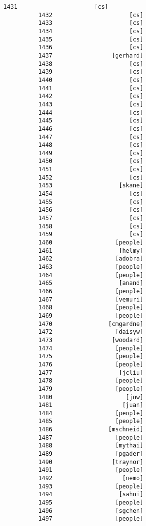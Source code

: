 \documentclass[11pt]{article}
\begin{document}
\begin{Verbatim}[commandchars=\\\{\}]
          1431                      [cs]
          1432                      [cs]
          1433                      [cs]
          1434                      [cs]
          1435                      [cs]
          1436                      [cs]
          1437                 [gerhard]
          1438                      [cs]
          1439                      [cs]
          1440                      [cs]
          1441                      [cs]
          1442                      [cs]
          1443                      [cs]
          1444                      [cs]
          1445                      [cs]
          1446                      [cs]
          1447                      [cs]
          1448                      [cs]
          1449                      [cs]
          1450                      [cs]
          1451                      [cs]
          1452                      [cs]
          1453                   [skane]
          1454                      [cs]
          1455                      [cs]
          1456                      [cs]
          1457                      [cs]
          1458                      [cs]
          1459                      [cs]
          1460                  [people]
          1461                   [helmy]
          1462                  [adobra]
          1463                  [people]
          1464                  [people]
          1465                   [anand]
          1466                  [people]
          1467                  [vemuri]
          1468                  [people]
          1469                  [people]
          1470                [cmgardne]
          1472                  [daisyw]
          1473                 [woodard]
          1474                  [people]
          1475                  [people]
          1476                  [people]
          1477                   [jcliu]
          1478                  [people]
          1479                  [people]
          1480                     [jnw]
          1481                    [juan]
          1484                  [people]
          1485                  [people]
          1486                [mschneid]
          1487                  [people]
          1488                  [mythai]
          1489                  [pgader]
          1490                 [traynor]
          1491                  [people]
          1492                    [nemo]
          1493                  [people]
          1494                   [sahni]
          1495                  [people]
          1496                  [sgchen]
          1497                  [people]

\end{Verbatim}
\end{document}
